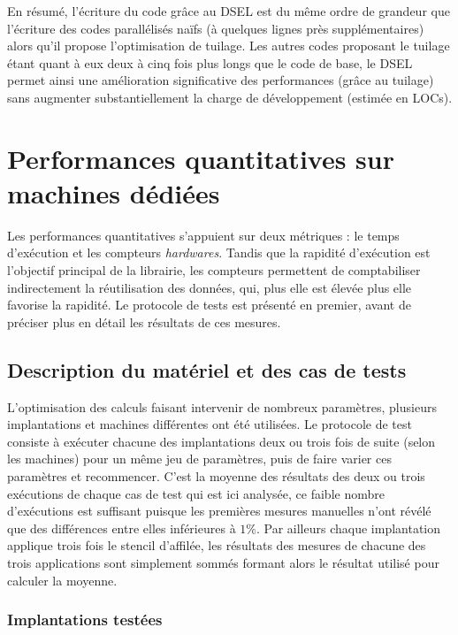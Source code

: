 En résumé, l'écriture du code grâce au DSEL est du même ordre de grandeur que l'écriture des codes parallélisés naïfs (à quelques lignes près supplémentaires) alors qu'il propose l'optimisation de tuilage. Les autres codes proposant le tuilage étant quant à eux deux à cinq fois plus longs que le code de base, le DSEL permet ainsi une amélioration significative des performances (grâce au tuilage) sans augmenter substantiellement la charge de développement (estimée en LOCs).


\section{Performances quantitatives sur machines dédiées}

Les performances quantitatives s'appuient sur deux métriques : le temps d'exécution et les compteurs \emph{hardwares}. Tandis que la rapidité d'exécution est l'objectif principal de la librairie, les compteurs permettent de comptabiliser indirectement la réutilisation des données, qui, plus elle est élevée plus elle favorise la rapidité. Le protocole de tests est présenté en premier, avant de préciser plus en détail les résultats de ces mesures.

\subsection{Description du matériel et des cas de tests}
\label{sec:desc_mat_tests}

L'optimisation des calculs faisant intervenir de nombreux paramètres, plusieurs implantations et machines différentes ont été utilisées. Le protocole de test consiste à exécuter chacune des implantations deux ou trois fois de suite (selon les machines) pour un même jeu de paramètres, puis de faire varier ces paramètres et recommencer. C'est la moyenne des résultats des deux ou trois exécutions de chaque cas de test qui est ici analysée, ce faible nombre d'exécutions est suffisant puisque les premières mesures manuelles n'ont révélé que des différences entre elles inférieures à $1\%$. Par ailleurs chaque implantation applique trois fois le stencil d'affilée, les résultats des mesures de chacune des trois applications sont simplement sommés formant alors le résultat utilisé pour calculer la moyenne.

\subsubsection*{Implantations testées}

